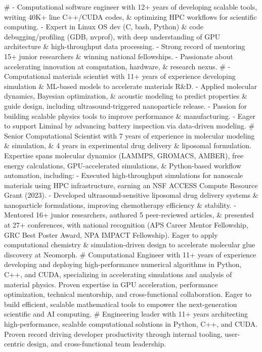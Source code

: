 #
- Computational software engineer with 12+ years of developing scalable tools, writing 40K+ line C++/CUDA codes, \& optimizing HPC workflows for scientific computing.
- Expert in Linux OS dev (C, bash, Python) \& code debugging/profiling (GDB, nvprof), with deep understanding of GPU architecture \& high-throughput data processing.
- Strong record of mentoring 15+ junior researchers \& winning national fellowships.
- Passionate about accelerating innovation at computation, hardware, \& research nexus.
#
- Computational materials scientist with 11+ years of experience developing simulation \& ML-based models to accelerate materials R\&D.
- Applied molecular dynamics, Bayesian optimization, \& acoustic modeling to predict properties \& guide design, including ultrasound-triggered nanoparticle release.
- Passion for building scalable physics tools to improve performance \& manufacturing.
- Eager to support Liminal by advancing battery inspection via data-driven modeling.
#
Senior Computational Scientist with 7 years of experience in molecular modeling \& simulation, \& 4 years in experimental drug delivery \& liposomal formulation. Expertise spans molecular dynamics (LAMMPS, GROMACS, AMBER), free energy calculations, GPU-accelerated simulations, \& Python-based workflow automation, including:
- Executed high-throughput simulations for nanoscale materials using HPC infrastructure, earning an NSF ACCESS Compute Resource Grant (2023).
- Developed ultrasound-sensitive liposomal drug delivery systems \& nanoparticle formulations, improving chemotherapy efficiency \& stability.
- Mentored 16+ junior researchers, authored 5 peer-reviewed articles, \& presented at 27+ conferences, with national recognition (APS Career Mentor Fellowship, GRC Best Poster Award, NPA IMPACT Fellowship). Eager to apply computational chemistry \& simulation-driven design to accelerate molecular glue discovery at Neomorph.
#
Computational Engineer with 11+ years of experience developing and deploying high-performance numerical algorithms in Python, C++, and CUDA, specializing in accelerating simulations and analysis of material physics.
Proven expertise in GPU acceleration, performance optimization, technical mentorship, and cross-functional collaboration.
Eager to build efficient, scalable mathematical tools to empower the next-generation scientific and AI computing.
#
Engineering leader with 11+ years architecting high-performance, scalable computational solutions in Python, C++, and CUDA.
Proven record driving developer productivity through internal tooling, user-centric design, and cross-functional team leadership.

